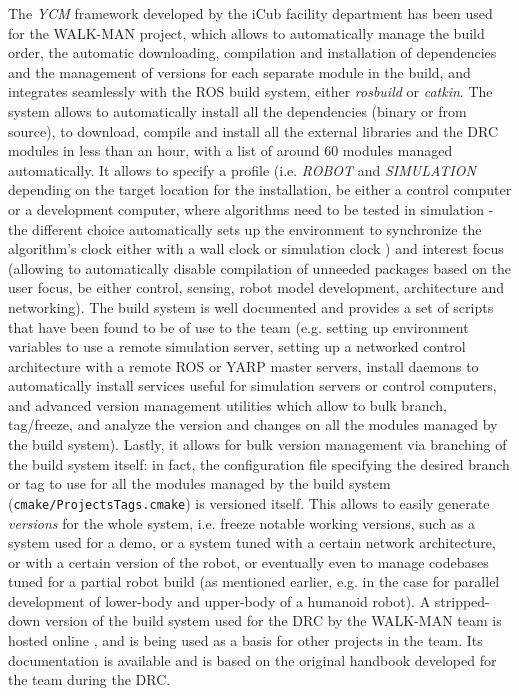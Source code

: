 The \emph{YCM} framework developed by the iCub facility department has been used for the WALK-MAN project, which allows to automatically manage the build order, the automatic downloading, compilation and installation of dependencies and the management of versions for each separate module in the build, and integrates seamlessly with the ROS build system, either \emph{rosbuild} or \emph{catkin}.
The system allows to automatically install all the dependencies (binary or from source), to download, compile and install all the external libraries and the DRC modules in less than an hour, with a list of around $60$ modules managed automatically. It allows to specify a profile (i.e. \emph{ROBOT} and \emph{SIMULATION} depending on the target location for the installation, be either a control computer or a development computer, where algorithms need to be tested in simulation - the different choice automatically sets up the environment to synchronize the algorithm's clock either with a wall clock or simulation clock \label{sec:simulation_clock}) and interest focus (allowing to automatically disable compilation of unneeded packages based on the user focus, be either control, sensing, robot model development, architecture and networking). The build system is well documented and provides a set of scripts that have been found to be of use to the team (e.g. setting up environment variables to use a remote simulation server, setting up a networked control architecture with a remote ROS or YARP master servers, install daemons to automatically install services useful for simulation servers or control computers, and advanced version management utilities which allow to bulk branch, tag/freeze, and analyze the version and changes on all the modules managed by the build system). Lastly, it allows for bulk version management via branching of the build system itself: in fact, the configuration file specifying the desired branch or tag to use for all the modules managed by the build system (\texttt{cmake/ProjectsTags.cmake}) is versioned itself. This allows to easily generate \emph{versions} for the whole system, i.e. freeze notable working versions,  such as a system used for a demo, or a system tuned with a certain network architecture, or with a certain version of the robot, or eventually even to manage codebases tuned for a partial robot build (as mentioned earlier, e.g. in the case for parallel development of lower-body and upper-body of a humanoid robot).
A stripped-down version of the build system used for the DRC by the WALK-MAN team is hosted online \cite{robotology-superbuild}, and is being used as a basis for other projects in the team. Its documentation is available \cite{robotology-superbuild-handbook} and is based on the original handbook developed for the team during the DRC.

